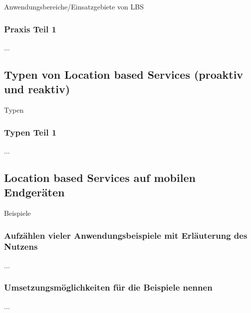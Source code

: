 Anwendungsbereiche/Einsatzgebiete von LBS
		\subsubsection{Praxis Teil 1}
...
	\subsection{Typen von Location based Services (proaktiv und reaktiv)}
Typen
	\subsubsection{Typen Teil 1}
...
	\subsection{Location based Services auf mobilen Endgeräten}
Beispiele
	\subsubsection{Aufzählen vieler Anwendungsbeispiele mit Erläuterung des Nutzens}
...
	\subsubsection{Umsetzungsmöglichkeiten für die Beispiele nennen}
...